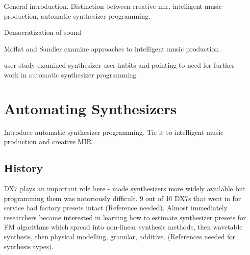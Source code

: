 General introduction. Distinction between creative mir, intelligent music production, automatic synthesizer programming.

Democratization of sound \cite{tavana2015democracy}

Moffat and Sandler examine approaches to intelligent music production \cite{moffat2019approaches}.

\cite{krekovic2019insights} user study examined synthesizer user habits and pointing to need for further work in automatic synthesizer programming

\section{Automating Synthesizers}
Introduce automatic synthesizer programming. Tie it to intelligent music production \cite{moffat2019approaches} \cite{de2017ten} and creative MIR \cite{humphrey2013brief}.

\subsection{History}
DX7 plays an important role here - made synthesizers more widely available but programming them was notoriously difficult. 9 out of 10 DX7s that went in for service had factory presets intact (Reference needed). Almost immediately researchers became interested in learning how to estimate synthesizer presets for FM algorithms which spread into non-linear synthesis methods, then wavetable synthesis, then physical modelling, granular, additive. (References needed for synthesis types). 

